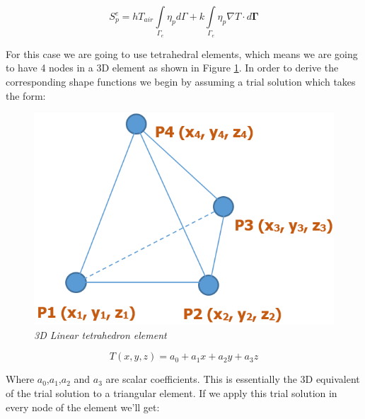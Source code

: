\documentclass[12pt]{article}
\begin{document}
\begin{equation}
 S_{p}^e = h T_{air} \int\limits_{\Gamma_e} \eta_p d\Gamma + k \int\limits_{\Gamma_{e}}{\eta_p\nabla T} \cdot d \mathbf{\Gamma}
\end{equation}

For this case we are going to use tetrahedral elements, which means we are going to have 4 nodes in a 3D element as shown in Figure \ref{fig:tetrahedron}. In order to derive the corresponding shape functions we begin by assuming a trial solution which takes the form:

\begin{figure}[h!]
    \includegraphics[scale=0.4]{tetrahedron.png}
    \centering
    \caption{\textit{3D Linear tetrahedron element}}
    \label{fig:tetrahedron}
\end{figure}

\begin{equation}
T(x,y,z) = a_0+a_1x+a_2y+a_3z
\end{equation}

Where $a_0$,$a_1$,$a_2$ and $a_3$ are scalar coefficients. This is essentially the 3D equivalent of the trial solution to a triangular element. If we apply this trial solution in every node of the element we'll get:
\end{document}
